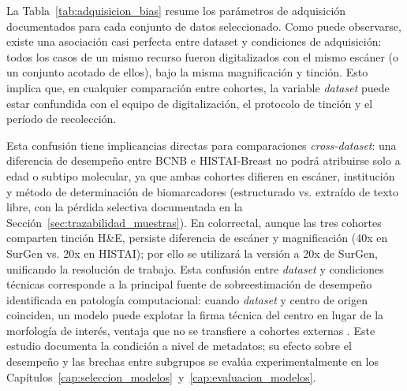 La Tabla~\ref{tab:adquisicion_bias} resume los parámetros de adquisición documentados para cada conjunto de datos seleccionado. Como puede observarse, existe una asociación casi perfecta entre dataset y condiciones de adquisición: todos los casos de un mismo recurso fueron digitalizados con el mismo escáner (o un conjunto acotado de ellos), bajo la misma magnificación y tinción. Esto implica que, en cualquier comparación entre cohortes, la variable \textit{dataset} puede estar confundida con el equipo de digitalización, el protocolo de tinción y el período de recolección.

\begin{table}[htbp]
\centering
\caption{Parámetros de adquisición y riesgo de confusión entre cohortes.}
\label{tab:adquisicion_bias}
\small
\setlength{\tabcolsep}{4pt}
\end{table}

Esta confusión tiene implicancias directas para comparaciones \textit{cross-dataset}: una diferencia de desempeño entre BCNB e HISTAI-Breast no podrá atribuirse solo a edad o subtipo molecular, ya que ambas cohortes difieren en escáner, institución y método de determinación de biomarcadores (estructurado vs. extraído de texto libre, con la pérdida selectiva documentada en la Sección~\ref{sec:trazabilidad_muestras}). En colorrectal, aunque las tres cohortes comparten tinción H\&E, persiste diferencia de escáner y magnificación (40x en SurGen vs. 20x en HISTAI); por ello se utilizará la versión a 20x de SurGen, unificando la resolución de trabajo. Esta confusión entre \textit{dataset} y condiciones técnicas corresponde a la principal fuente de sobreestimación de desempeño identificada en patología computacional: cuando \textit{dataset} y centro de origen coinciden, un modelo puede explotar la firma técnica del centro en lugar de la morfología de interés, ventaja que no se transfiere a cohortes externas \parencite{howard2021site}. Este estudio documenta la condición a nivel de metadatos; su efecto sobre el desempeño y las brechas entre subgrupos se evalúa experimentalmente en los Capítulos~\ref{cap:seleccion_modelos}~y~\ref{cap:evaluacion_modelos}.

